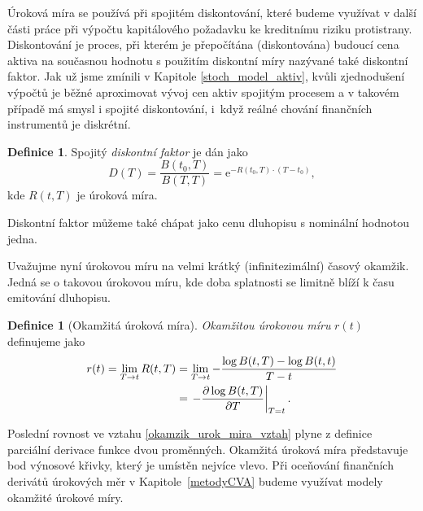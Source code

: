 \documentclass[a4paper,12pt]{report}
\theoremstyle{definition} \newtheorem{definice}[veta]{Definice}
\theoremstyle{remark}
\begin{document}



Úroková míra se používá při spojitém diskontování, které budeme využívat v další části práce při výpočtu kapitálového požadavku ke kreditnímu riziku protistrany. 
Diskontování je proces, při kterém je přepočítána (diskontována) budoucí cena aktiva na současnou hodnotu s použitím diskontní míry nazývané také diskontní faktor.
Jak už jsme zmínili v Kapitole \ref{stoch_model_aktiv}, kvůli zjednodušení výpočtů je běžné aproximovat vývoj cen aktiv spojitým procesem a v takovém případě má smysl i spojité diskontování, i~když reálné chování finančních instrumentů je diskrétní.
\begin{definice}
Spojitý \textit{diskontní faktor} je dán jako
\begin{equation}\label{diskontni_faktor}
D(T)=\frac{B(t_0,T)}{B(T,T)}=\mathrm{e}^{-R(t_0,T)\cdot(T-t_0)},
\end{equation}
kde $R(t,T)$ je úroková míra.
\end{definice}
Diskontní faktor můžeme také chápat jako cenu dluhopisu s nominální hodnotou jedna.

Uvažujme nyní úrokovou míru na velmi krátký (infinitezimální) časový okamžik.
Jedná se o takovou úrokovou míru, kde doba splatnosti se limitně blíží k času emitování dluhopisu.
\begin{definice}[Okamžitá úroková míra]
\textit{Okamžitou úrokovou míru} $r(t)$ definujeme jako
\begin{align}\label{okamzik_urok_mira_vztah}
r(t)=\lim_{T\to t}R(t,T)&=\lim_{T\to t}-\frac{\log B(t,T)-\log B(t,t)}{T-t}\notag\\
&=\left.-\frac{\partial\log B(t,T)}{\partial T}\right|_{T=t}.%
\end{align} 
\end{definice}
Poslední rovnost ve vztahu \eqref{okamzik_urok_mira_vztah} plyne z definice parciální derivace funkce dvou proměnných.
Okamžitá úroková míra představuje bod výnosové křivky, který je umístěn nejvíce vlevo.
Při oceňování finančních derivátů úrokových měr v Kapitole~\ref{metodyCVA} budeme využívat modely okamžité úrokové míry.
\end{document}
